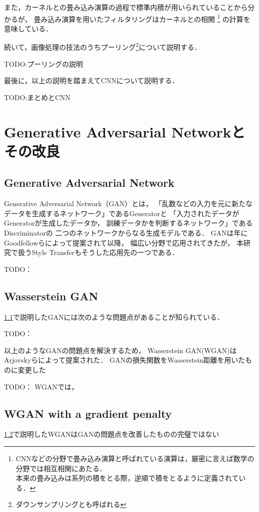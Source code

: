 \documentclass[\homedir/main.tex]{subfiles}
\begin{document}
また，カーネルとの畳み込み演算の過程で標準内積が用いられていることから分かるが，
畳み込み演算を用いたフィルタリングはカーネルとの相関
\footnote{
    CNNなどの分野で畳み込み演算と呼ばれている演算は，厳密に言えば数学の分野では相互相関にあたる．\\
    本来の畳み込みは系列の積をとる際，逆順で積をとるように定義されている．
}
の計算を意味している．

続いて，画像処理の技法のうちプーリング\footnote{ダウンサンプリングとも呼ばれる}について説明する．

TODO:プーリングの説明

最後に，以上の説明を踏まえてCNNについて説明する．

TODO:まとめとCNN

\section{Generative Adversarial Networkとその改良}\label{sec:gan_and_its_improvements}
\subsection{Generative Adversarial Network}\label{sec:gan}
Generative Adversarial Network（GAN）とは，
「乱数などの入力を元に新たなデータを生成するネットワーク」であるGeneratorと
「入力されたデータがGeneratorが生成したデータか，
訓練データかを判断するネットワーク」であるDiscriminatorの
二つのネットワークからなる生成モデルである．
GANは\citeyear{NIPS2014_5ca3e9b1}年に
Goodfellowら\cite{NIPS2014_5ca3e9b1}によって提案されて以降，
幅広い分野で応用されてきたが，
本研究で扱うStyle Transferもそうした応用先の一つである．


TODO：



\subsection{Wasserstein GAN}\label{sec:wgan}
\cref{sec:gan}で説明したGANには次のような問題点があることが知られている．

TODO：

以上のようなGANの問題点を解決するため，
Wasserstein GAN(WGAN)は
Arjovskyら\cite{pmlr-v70-arjovsky17a}によって提案された．
GANの損失関数をWasserstein距離を用いたものに変更した

TODO：
WGANでは，

\subsection{WGAN with a gradient penalty}\label{sec:wgan_gp}
\cref{sec:wgan}で説明したWGANはGANの問題点を改善したものの完璧ではない
\end{document}
